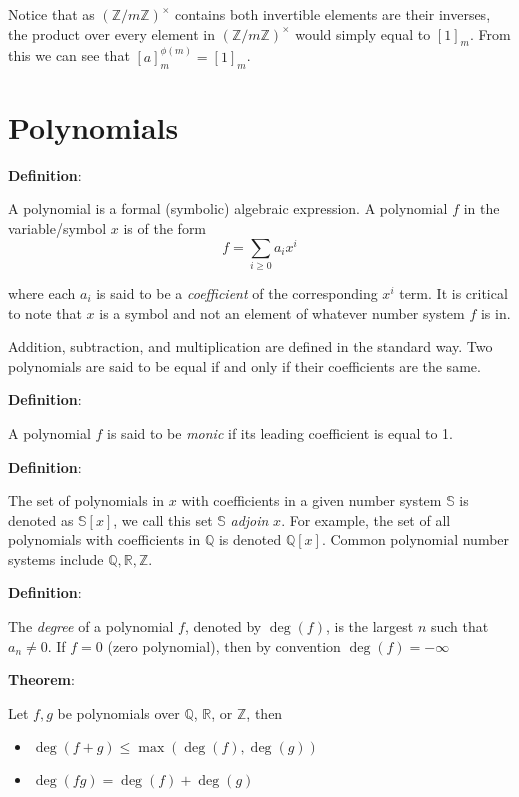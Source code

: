 \documentclass{article}
\begin{document}
\begin{multicols*}{2}
Notice that as $(\mathbb{Z}/m\mathbb{Z})^\times$ contains both invertible elements are their inverses, the product over every element in $(\mathbb{Z}/m\mathbb{Z})^\times$ would simply equal to $[1]_m$. From this we can see that $[a]_m ^{\phi(m)} = [1]_m$.

\section{Polynomials}

\textbf{Definition}:

A polynomial is a formal (symbolic) algebraic expression. A polynomial $f$ in the variable/symbol $x$ is of the form \[f = \sum_{i \geq 0} a_i x^i\]

where each $a_i$ is said to be a \textit{coefficient} of the corresponding $x^i$ term. It is critical to note that $x$ is a symbol and not an element of whatever number system $f$ is in.

Addition, subtraction, and multiplication are defined in the standard way. Two polynomials are said to be equal if and only if their coefficients are the same.

\textbf{Definition}:

A polynomial $f$ is said to be \textit{monic} if its leading coefficient is equal to 1.

\textbf{Definition}:

The set of polynomials in $x$ with coefficients in a given number system $\mathbb{S}$ is denoted as $\mathbb{S}[x]$, we call this set $\mathbb{S}$ \textit{adjoin} $x$. For example, the set of all polynomials with coefficients in $\mathbb{Q}$ is denoted $\mathbb{Q}[x]$. Common polynomial number systems include $\mathbb{Q,R,Z}$.

\textbf{Definition}:

The \textit{degree} of a polynomial $f$, denoted by $\deg(f)$, is the largest $n$ such that $a_n \neq 0$. If $f = 0$ (zero polynomial), then by convention $\deg(f) = -\infty$

\textbf{Theorem}:

Let $f, g$ be polynomials over $\mathbb{Q}$, $\mathbb{R}$, or $\mathbb{Z}$, then

\begin{itemize}
    \item[(1)] $\deg(f+g) \leq \max(\deg(f), \deg(g))$
    \item[(2)] $\deg(fg) = \deg(f) + \deg(g)$
\end{itemize}


\end{multicols*}
\end{document}

